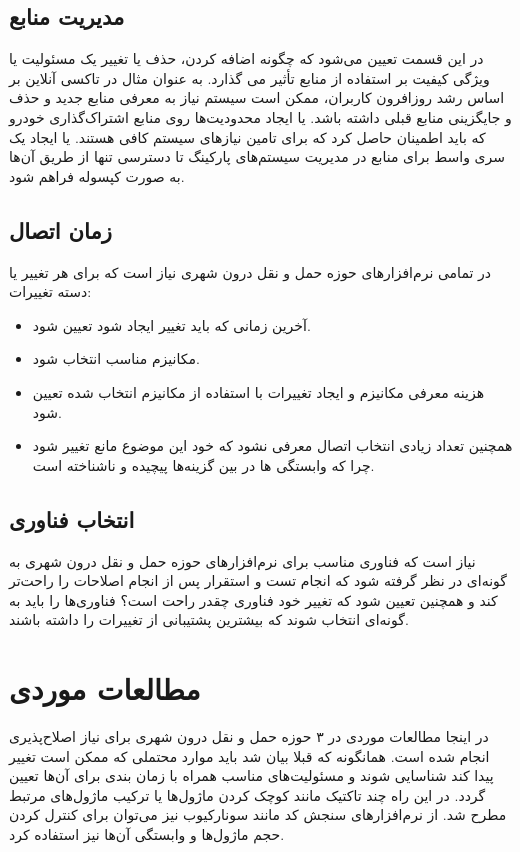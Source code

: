 \subsection{مدیریت منابع}
در این قسمت تعیین می‌شود که چگونه اضافه کردن، حذف یا تغییر یک مسئولیت یا ویژگی کیفیت بر استفاده از منابع تأثیر می گذارد. به عنوان مثال در تاکسی آنلاین بر اساس رشد روزافرون کاربران، ممکن است سیستم نیاز به معرفی منابع جدید و حذف و جایگزینی منابع قبلی داشته باشد. یا ایجاد محدودیت‌ها روی منابع اشتراک‌گذاری خودرو که باید اطمینان حاصل کرد که برای تامین نیازهای سیستم کافی هستند. یا ایجاد یک سری واسط برای منابع در مدیریت سیستم‌های پارکینگ تا دسترسی تنها از طریق آن‌ها به صورت کپسوله فراهم شود.
\subsection{زمان اتصال}
در تمامی نرم‌افزارهای حوزه حمل و نقل درون شهری نیاز است که برای هر تغییر یا دسته تغییرات:
\begin{itemize}
\item
آخرین زمانی که باید تغییر ایجاد شود تعیین شود.
\item
مکانیزم مناسب انتخاب شود.
\item
هزینه معرفی مکانیزم و ایجاد تغییرات با استفاده از مکانیزم انتخاب شده تعیین شود.
\item
همچنین تعداد زیادی انتخاب اتصال معرفی نشود که خود این موضوع مانع تغییر شود چرا که وابستگی ها در بین گزینه‌ها پیچیده و ناشناخته است.
\end{itemize}
\subsection{انتخاب فناوری}
نیاز است که فناوری مناسب برای نرم‌افزارهای حوزه حمل و نقل درون شهری به گونه‌ای در نظر گرفته شود که انجام تست و استقرار پس از انجام اصلاحات را راحت‌تر کند و همچنین تعیین شود که تغییر خود فناوری چقدر راحت است؟ فناوری‌ها را باید به گونه‌ای انتخاب شوند که بیشترین پشتیبانی از تغییرات را داشته باشند.

\section{مطالعات موردی}

در اینجا مطالعات موردی در ۳ حوزه حمل و نقل درون شهری برای نیاز اصلاح‌‌پذیری انجام شده است.
همانگونه که قبلا بیان شد باید موارد محتملی که ممکن است تغییر پیدا کند شناسایی شوند و مسئولیت‌های مناسب همراه با زمان بندی برای آن‌ها تعیین گردد. در این راه چند تاکتیک مانند کوچک کردن ماژول‌ها یا ترکیب ماژول‌های مرتبط مطرح شد.
از نرم‌افزارهای سنجش کد مانند سونارکیوب نیز می‌توان برای کنترل کردن حجم ماژول‌ها و وابستگی آن‌ها نیز استفاده کرد. 
